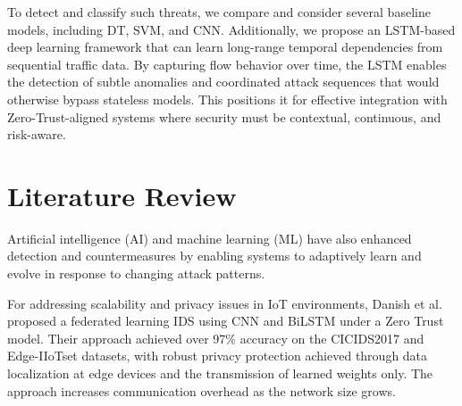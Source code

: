 \documentclass[conference]{IEEEtran}
\begin{document}

To detect and classify such threats, we compare and consider several baseline models, including DT, SVM, and CNN. Additionally, we propose an LSTM-based deep learning framework that can learn long-range temporal dependencies from sequential traffic data. By capturing flow behavior over time, the LSTM enables the detection of subtle anomalies and coordinated attack sequences that would otherwise bypass stateless models. This positions it for effective integration with Zero-Trust-aligned systems where security must be contextual, continuous, and risk-aware.


\section{Literature Review}\label{sec2}


Artificial intelligence (AI) and machine learning (ML) have also enhanced detection and countermeasures by enabling systems to adaptively learn and evolve in response to changing attack patterns.


For addressing scalability and privacy issues in IoT environments, Danish et al. \cite{javeed2024federated} proposed a federated learning IDS using CNN and BiLSTM under a Zero Trust model. Their approach achieved over 97\% accuracy on the CICIDS2017 and Edge-IIoTset datasets, with robust privacy protection achieved through data localization at edge devices and the transmission of learned weights only. The approach increases communication overhead as the network size grows.
\end{document}
